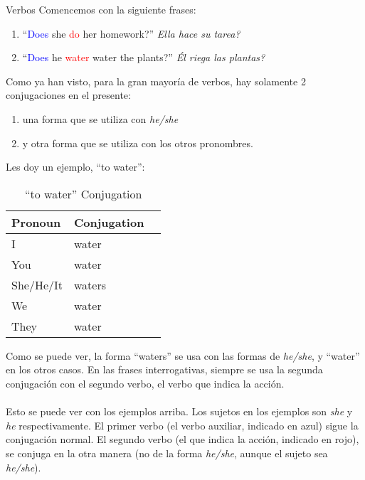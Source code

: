 \begin{conf}{Verbos}
	Comencemos con la siguiente frases:
	\begin{enumerate}
		\item ``\textcolor{blue}{Does} she \textcolor{red}{do} her homework?'' \arr
			\emph{\textquestiondown Ella hace su tarea?}
		\item ``\textcolor{blue}{Does} he \textcolor{red}{water} water the plants?''
			\arr \emph{\textquestiondown Él riega las plantas?}
	\end{enumerate}

	Como ya han visto, para la gran mayoría de verbos, hay solamente 2 conjugaciones en el presente:
	\begin{enumerate}
		\item una forma que se utiliza con \emph{he/she}
		\item y otra forma que se utiliza con los otros pronombres.
	\end{enumerate}
	Les doy un ejemplo, ``to water'':

	\begin{table}[H]
		\centering
		\begin{tabular}{lll}
		\toprule
			\textbf{Pronoun} & \textbf{Conjugation}\\
		\midrule
			I & water \\
			You & water \\
			She/He/It & waters \\
			We & water \\
			They & water \\
		\bottomrule
		\end{tabular}
		\caption{``to water'' Conjugation}
	\end{table}

	Como se puede ver, la forma ``waters'' se usa con las formas de \emph{he/she}, y ``water''
	en los otros casos.
	En las frases interrogativas, siempre se usa la segunda conjugación con el segundo verbo, el verbo que indica
	la acción. \\ \\

	Esto se puede ver con los ejemplos arriba. Los sujetos en los ejemplos son \emph{she}
	y \emph{he} respectivamente. El primer verbo (el verbo auxiliar, indicado en azul) sigue la conjugación normal.
	El segundo verbo (el que indica la acción, indicado en rojo), se conjuga en la otra manera (no de la forma \emph{he/she},
	aunque el sujeto sea \emph{he/she}).
\end{conf}
